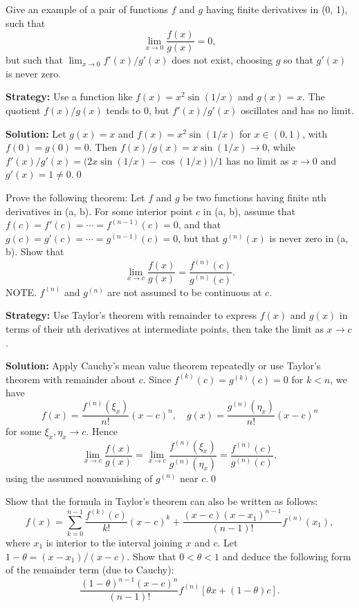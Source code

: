 \begin{problembox}
Give an example of a pair of functions \( f \) and \( g \) having finite derivatives in (0, 1), such that
\[ \lim_{x \to 0} \frac{f(x)}{g(x)} = 0, \]
but such that \( \lim_{x \to 0} f'(x)/g'(x) \) does not exist, choosing \( g \) so that \( g'(x) \) is never zero.
\end{problembox}

\noindent\textbf{Strategy:} Use a function like \( f(x) = x^2 \sin(1/x) \) and \( g(x) = x \). The quotient \( f(x)/g(x) \) tends to 0, but \( f'(x)/g'(x) \) oscillates and has no limit.

\bigskip\noindent\textbf{Solution:}
Let $g(x)=x$ and $f(x)=x^2\sin(1/x)$ for $x\in(0,1)$, with $f(0)=g(0)=0$. Then $f(x)/g(x)=x\sin(1/x)\to 0$, while $f'(x)/g'(x)=\big(2x\sin(1/x)-\cos(1/x)\big)/1$ has no limit as $x\to 0$ and $g'(x)=1\ne 0$.\qed


\begin{problembox}
Prove the following theorem: Let \( f \) and \( g \) be two functions having finite nth derivatives in (a, b). For some interior point \( c \) in (a, b), assume that \( f(c) = f'(c) = \cdots = f^{(n-1)}(c) = 0 \), and that \( g(c) = g'(c) = \cdots = g^{(n-1)}(c) = 0 \), but that \( g^{(n)}(x) \) is never zero in (a, b). Show that
\[ \lim_{x \to c} \frac{f(x)}{g(x)} = \frac{f^{(n)}(c)}{g^{(n)}(c)}. \]
NOTE. \( f^{(n)} \) and \( g^{(n)} \) are not assumed to be continuous at \( c \).
\end{problembox}

\noindent\textbf{Strategy:} Use Taylor's theorem with remainder to express \( f(x) \) and \( g(x) \) in terms of their nth derivatives at intermediate points, then take the limit as \( x \to c \).

\bigskip\noindent\textbf{Solution:}
Apply Cauchy's mean value theorem repeatedly or use Taylor's theorem with remainder about $c$. Since $f^{(k)}(c)=g^{(k)}(c)=0$ for $k<n$, we have
\[f(x)=\frac{f^{(n)}(\xi_x)}{n!}(x-c)^n,\quad g(x)=\frac{g^{(n)}(\eta_x)}{n!}(x-c)^n\]
for some $\xi_x,\eta_x\to c$. Hence
\[\lim_{x\to c}\frac{f(x)}{g(x)}=\lim_{x\to c}\frac{f^{(n)}(\xi_x)}{g^{(n)}(\eta_x)}=\frac{f^{(n)}(c)}{g^{(n)}(c)},\]
using the assumed nonvanishing of $g^{(n)}$ near $c$.\qed


\begin{problembox}
Show that the formula in Taylor's theorem can also be written as follows:
\[ f(x) = \sum_{k=0}^{n-1} \frac{f^{(k)}(c)}{k!} (x - c)^k + \frac{(x - c)(x - x_1)^{n-1}}{(n - 1)!} f^{(n)}(x_1), \]
where \( x_1 \) is interior to the interval joining \( x \) and \( c \). Let \( 1 - \theta = (x - x_1)/(x - c) \). Show that \( 0 < \theta < 1 \) and deduce the following form of the remainder term (due to Cauchy):
\[ \frac{(1 - \theta)^{n-1}(x - c)^n}{(n - 1)!} f^{(n)}[\theta x + (1 - \theta)c]. \]
\end{problembox}

